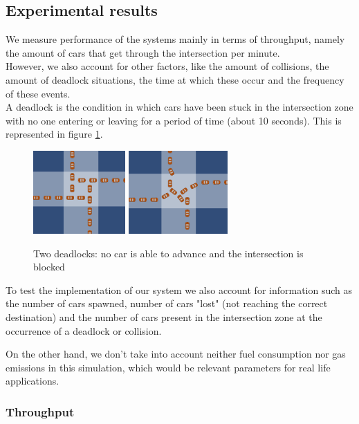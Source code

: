 \subsection{Experimental results}

We measure performance of the systems mainly in terms of throughput, namely the amount of cars that get through the intersection per minute.\\
However, we also account for other factors, like the amount of collisions, the amount of deadlock situations, the time at which these occur and the frequency of these events.\\
\noindent
A deadlock is the condition in which cars have been stuck in the intersection zone with no one entering or leaving for a period of time (about 10 seconds). This is represented in figure \ref{fig:deadlock}.\\

\begin{figure}
\centering
\includegraphics[height=120px]{img/deadlock2}
\includegraphics[height=120px]{img/deadlock}
\caption{Two deadlocks: no car is able to advance and the intersection is blocked}
\label{fig:deadlock}
\end{figure}
\noindent
To test the implementation of our system we also account for information such as the number of cars spawned, number of cars "lost" (not reaching the correct destination) and the number of cars present in the intersection zone at the occurrence of a deadlock or collision.


On the other hand, we don't take into account neither fuel consumption nor gas emissions in this simulation, which would be relevant parameters for real life applications.

\subsubsection{Throughput}

